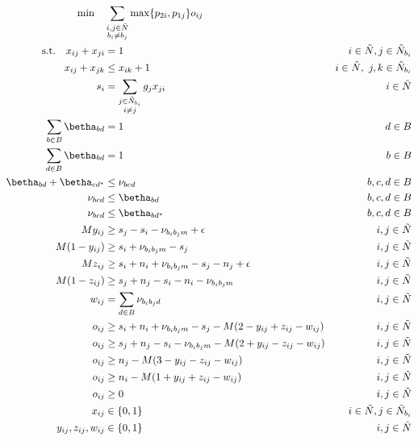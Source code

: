 \documentclass{article}
\begin{document}
\begin{align}
    \text{min}\quad &\sum_{\substack{i,j\in\tilde{N}\\b_i\neq b_j}} 
            \max\{p_{2i},p_{1j}\}o_{ij} \label{objfunc}\\
    \text{s.t.} \quad x_{ij} + x_{ji} &= 1 &i\in\tilde{N}, j\in\tilde{N}_{b_i} 
            \label{con:reflex}\\
    x_{ij} + x_{jk} &\leq x_{ik} + 1 &i\in\tilde{N},\,\, j,k\in\tilde{N}_{b_i} 
            \label{con:transitiv} \\
    s_i &= \sum_{\substack{j\in\tilde{N}_{b_i}\\i\neq j}} g_j x_{ji} &i\in\tilde{N} 
            \label{con:start} \\
    \sum_{b\in B}\betha_{bd} &= 1 &d\in B \\
    \sum_{d\in B}\betha_{bd} &= 1 &b\in B \\
    \betha_{bd} + \betha_{cd^*} &\leq \nu_{bcd} &b,c,d\in B \\
    \nu_{bcd} &\leq \betha_{bd} &b,c,d\in B \\
    \nu_{bcd} &\leq \betha_{bd^*} &b,c,d\in B \\
    My_{ij} &\geq s_j - s_i - \nu_{b_ib_jm} + \epsilon &i,j\in\tilde{N} \\
    M(1-y_{ij}) &\geq s_i + \nu_{b_ib_jm} - s_j &i,j\in\tilde{N} \\
    Mz_{ij} &\geq s_i + n_i + \nu_{b_ib_jm} - s_j - n_j + \epsilon &i,j\in\tilde{N} \\
    M(1-z_{ij}) &\geq s_j + n_j - s_i - n_i - \nu_{b_ib_jm} &i,j\in\tilde{N} \\
    w_{ij} &= \sum_{d\in B} \nu_{b_ib_jd} &i,j\in\tilde{N} \\
    o_{ij} &\geq s_i + n_i + \nu_{b_ib_jm} - s_j - M(2-y_{ij}+z_{ij}-w_{ij}) &i,j\in\tilde{N} \\
    o_{ij} &\geq s_j + n_j - s_i - \nu_{b_ib_jm} - M(2+y_{ij}-z_{ij}-w_{ij}) &i,j\in\tilde{N} \\
    o_{ij} &\geq n_j - M(3-y_{ij}-z_{ij}-w_{ij}) &i,j\in\tilde{N} \\
    o_{ij} &\geq n_i - M(1+y_{ij}+z_{ij}-w_{ij}) &i,j\in\tilde{N} \\
    o_{ij} &\geq 0 &i,j\in\tilde{N} \\
    x_{ij} &\in \{0,1\} &i\in\tilde{N},j\in\tilde{N}_{b_i} \\
    y_{ij},z_{ij},w_{ij} &\in \{0,1\} &i,j\in\tilde{N}
\end{align}
\end{document}
